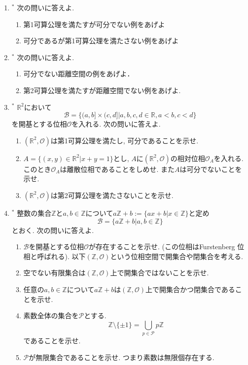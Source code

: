 \documentclass[dvipdfmx,a4paper,11pt]{article}
\newcommand{\R}{\mathbb{R}}
\newcommand{\Z}{\mathbb{Z}}
\theoremstyle{definition}
\begin{document}
\begin{enumerate}[ label=\textbf{問}4.\arabic*]
\item $^{*}$ 次の問いに答えよ.
	\begin{enumerate}
	\item 第1可算公理を満たすが可分でない例をあげよ
	\item 可分であるが第1可算公理を満たさない例をあげよ
	\end{enumerate}
\item  $^{*}$ 次の問いに答えよ.	
	\begin{enumerate}
	\item 可分でない距離空間の例をあげよ．
	\item 第2可算公理を満たすが距離空間でない例をあげよ.
	\end{enumerate}
\item  $^{*}$ $\R^2$において
$$
\mathscr{B} = \{(a,b] \times (c,d]| a,b,c,d \in \R, a<b, c<d\} 
$$
を開基とする位相$\mathscr{O}$を入れる.
次の問いに答えよ. 
	 \begin{enumerate}
	\item $(\R^2,\mathscr{O})$は第1可算公理を満たし, 可分であることを示せ.
	\item $ A=\{ (x,y)\in \R^2 | x+y=1\}$とし, $A$に$(\R^2,\mathscr{O})$の相対位相$\mathscr{O}_A$を入れる. このとき$\mathscr{O}_A$は離散位相であることをしめせ. また$A$は可分でないことを示せ.
	\item $(\R^2,\mathscr{O})$は第2可算公理を満たさないことを示せ.
	\end{enumerate}
\item  $^{*}$ 整数の集合$\Z$と$a,b \in \Z$について$
a\Z + b := \{ ax + b | x \in \Z\}$と定め
$$
\mathscr{B} = \{ a\Z + b | a,b\in \Z \} 
$$
とおく. 次の問いに答えよ. 
	\begin{enumerate}
	\item $\mathscr{B}$を開基とする位相$\mathscr{O}$が存在することを示せ. (この位相はFurstenberg 位相と呼ばれる). 以下$(\Z,\mathscr{O} )$という位相空間で開集合や閉集合を考える. 
	\item 空でない有限集合は$(\Z, \mathscr{O})$上で開集合ではないことを示せ. 
	\item 任意の$a,b \in \Z$について$a\Z + b$は$(\Z, \mathscr{O})$上で開集合かつ閉集合であることを示せ.
	\item 素数全体の集合を$\mathcal{P}$とする.
	$$\Z \setminus \{ \pm 1\} = \bigcup_{p \in \mathcal{P}} p\Z$$
	であることを示せ.
	\item $\mathcal{P}$が無限集合であることを示せ. つまり素数は無限個存在する.
	\end{enumerate}



\end{enumerate}
\end{document}
